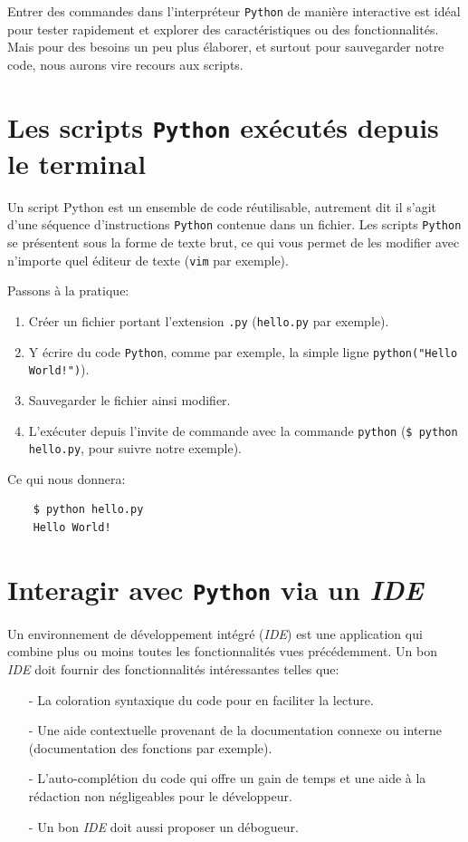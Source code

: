 Entrer des commandes dans l'interpréteur \texttt{Python} de manière interactive est idéal pour tester rapidement et explorer des caractéristiques ou des fonctionnalités. Mais pour des besoins un peu plus élaborer, et surtout pour sauvegarder notre code, nous aurons vire recours aux scripts.
\medskip

\section{Les scripts \texttt{Python} exécutés depuis le terminal}
Un script Python est un ensemble de code réutilisable, autrement dit il s'agit d'une séquence d'instructions \texttt{Python} contenue dans un fichier. Les scripts \texttt{Python} se présentent sous la forme de texte brut, ce qui vous permet de les modifier avec n'importe quel éditeur de texte (\texttt{vim} par exemple).
\medskip

Passons à la pratique:
\begin{enumerate}
	\item Créer un fichier portant l'extension \texttt{.py} (\texttt{hello.py} par exemple).
	\item Y écrire du code \texttt{Python}, comme par exemple, la simple ligne \texttt{python("Hello World!")}).
	\item Sauvegarder le fichier ainsi modifier.
	\item L'exécuter depuis l'invite de commande avec la commande \texttt{python} (\verb|$ python hello.py|, pour suivre notre exemple).
\end{enumerate}
\medskip

Ce qui nous donnera:
\begin{verbatim}
    $ python hello.py
    Hello World!
\end{verbatim}

\section{Interagir avec \texttt{Python} via un \textit{IDE}}
Un environnement de développement intégré (\textit{IDE}) est une application qui combine plus ou moins toutes les fonctionnalités vues précédemment. Un bon \textit{IDE} doit fournir des fonctionnalités intéressantes telles que:
\begin{itemize}
	\item[-] La coloration syntaxique du code pour en faciliter la lecture.
	\item[-] Une aide contextuelle provenant de la documentation connexe ou interne (documentation des fonctions par exemple).
	\item[-] L'auto-complétion du code qui offre un gain de temps et une aide à la rédaction non négligeables pour le développeur.
	\item[-] Un bon \textit{IDE} doit aussi proposer un débogueur.
\end{itemize}
\medskip

